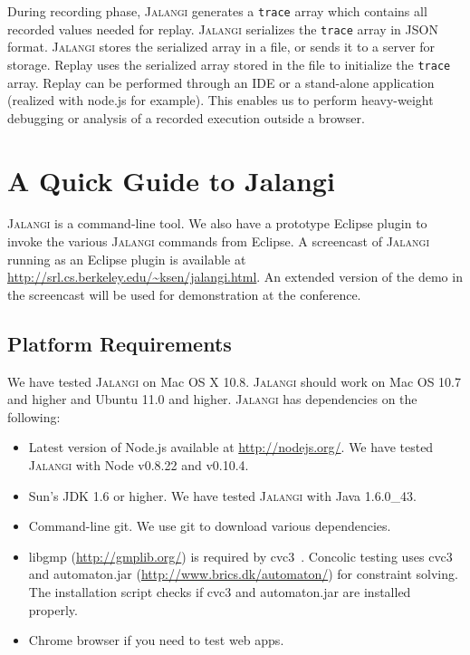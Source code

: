 \documentclass{sig-alternate}
\def\jalangi{\textsc{Jalangi}}
\begin{document}
During recording phase, \jalangi{} generates a \texttt{trace} array
which contains all recorded values needed for replay.  \jalangi{}
serializes the \texttt{trace} array in JSON format.  \jalangi{} stores
the serialized array in a file, or sends it to a server for storage.
Replay uses the serialized array stored in the file to initialize the
\texttt{trace} array. Replay can be performed through an IDE or a
stand-alone application (realized with node.js for example). This
enables us to perform heavy-weight debugging or analysis of a recorded
execution outside a browser.

\section{A Quick Guide to Jalangi}
\label{sec:usage}

\jalangi{} is a command-line tool.  We also have a prototype Eclipse
plugin to invoke the various \jalangi{} commands from Eclipse.  A
screencast of \jalangi{} running as an Eclipse plugin is available at
\url{http://srl.cs.berkeley.edu/~ksen/jalangi.html}.  An extended
version of the demo in the screencast will be used for demonstration
at the conference.

\subsection{Platform Requirements}
\label{sec:platf-requ}

We have tested \jalangi{} on Mac OS X 10.8. \jalangi{} should work on
Mac OS 10.7 and higher and Ubuntu 11.0 and higher.  \jalangi{} has
dependencies on the following:

\begin{itemize}
\item Latest version of Node.js available at
  \url{http://nodejs.org/}. We have tested \jalangi{} with Node v0.8.22
  and v0.10.4.
\item Sun's JDK 1.6 or higher. We have tested \jalangi{} with Java
  1.6.0\_43.
\item Command-line git.  We use git to download various dependencies.
\item libgmp (\url{http://gmplib.org/}) is required by
  cvc3~\cite{BT07}. Concolic testing uses cvc3 and automaton.jar
  (\url{http://www.brics.dk/automaton/}) for constraint solving. The
  installation script checks if cvc3 and automaton.jar are installed
  properly.
\item Chrome browser if you need to test web apps.
\end{itemize}
\end{document}
